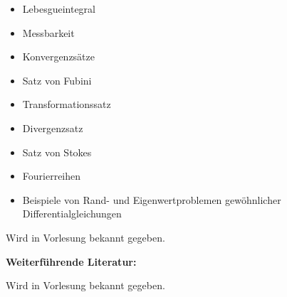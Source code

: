 \begin{course}
\begin{content}
\begin{itemize}\item Lebesgueintegral  \item Messbarkeit  \item Konvergenzsätze  \item Satz von Fubini  \item Transformationssatz  \item Divergenzsatz  \item Satz von Stokes  \item Fourierreihen  \item Beispiele von Rand- und Eigenwertproblemen gewöhnlicher Differentialgleichungen  \end{itemize}
\end{content}



\begin{literature}Wird in Vorlesung bekannt gegeben.

 

\textbf{Weiterführende Literatur:}

 

Wird in Vorlesung bekannt gegeben.

\end{literature}



\end{course}